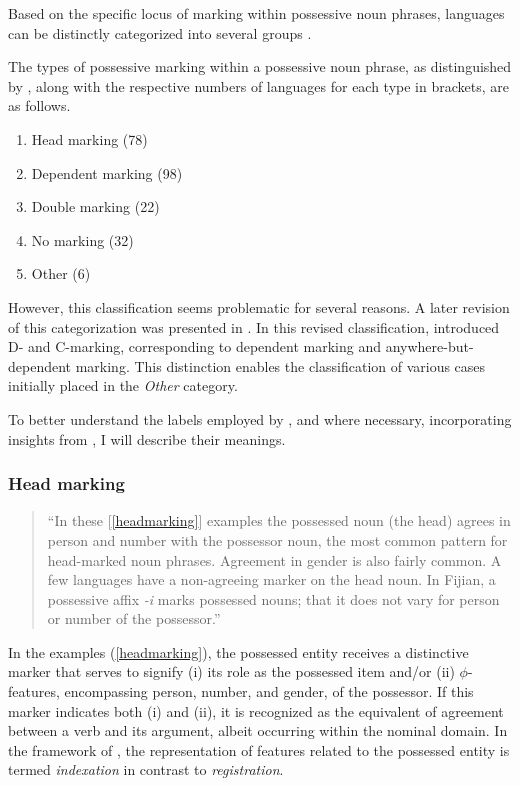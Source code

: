 Based on the specific locus of marking within possessive noun phrases, languages can be distinctly categorized into several groups \citep{nichols_locus_2013,van2016locus,van2016grammaticalization, lander2020head}.

The types of possessive marking within a possessive noun phrase, as distinguished by \cite{nichols_locus_2013}, along with the respective numbers of languages for each type in brackets, are as follows.

\begin{enumerate}
    \item Head marking (78)
    \item Dependent marking (98)
    \item Double marking (22)
    \item No marking (32)
    \item Other (6)
\end{enumerate}

However, this classification seems problematic for several reasons. A later revision of this categorization was presented in \cite{lander2020head}. In this revised classification, \cite{lander2020head} introduced D- and C-marking, corresponding to dependent marking and anywhere-but-dependent marking. This distinction enables the classification of various cases initially placed in the \textit{Other} category.

To better understand the labels employed by \cite{nichols_locus_2013}, and where necessary, incorporating insights from \cite{lander2020head}, I will describe their meanings.

\subsubsection{Head marking}

\begin{quote}
    ``In these [\ref{headmarking}] examples the possessed noun (the head) agrees in person and number with the possessor noun, the most common pattern for head-marked noun phrases. Agreement in gender is also fairly common. A few languages have a non-agreeing marker on the head noun. In Fijian, a possessive affix \textit{-i} marks possessed nouns; that it does not vary for person or number of the possessor.'' \citep{nichols_locus_2013}
\end{quote}

In the examples (\ref{headmarking}), the possessed entity receives a distinctive marker that serves to signify (i) its role as the possessed item and/or (ii) $\phi$-features, encompassing person, number, and gender, of the possessor. If this marker indicates both (i) and (ii), it is recognized as the equivalent of agreement between a verb and its argument, albeit occurring within the nominal domain. In the framework of \cite{lander2020head}, the representation of features related to the possessed entity is termed \textit{indexation} in contrast to \textit{registration}.

